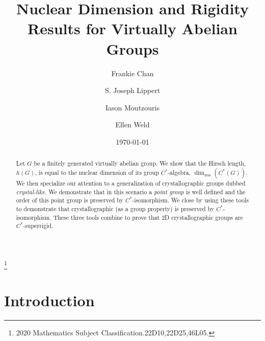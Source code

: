 \documentclass[11pt, twoside]{amsart}
\newcommand{\dimnuc }{\dim_{\operatorname{nuc}}}
\theoremstyle{definition}
\newcommand\nnfootnote[1]{%
  \begin{NoHyper}
  \renewcommand\thefootnote{}\footnote{#1}%
  \addtocounter{footnote}{-1}%
  \end{NoHyper}
}
\begin{document}
\title{Nuclear Dimension and Rigidity Results for Virtually Abelian Groups}


\author{Frankie Chan}
\address{FC: Department of Mathematics, University of Chicago, Chicago IL 60637, USA}

\author{S. Joseph Lippert}
\address{JL: Department of Mathematics and Statistics, Sam Houston State University, Huntsville TX 77341, USA}

\author{Iason Moutzouris}
\address{IM: Department of Mathematics and Statistics, Sam Houston State University, Huntsville TX 77341, USA}



\author{Ellen Weld}
\address{EW: Department of Mathematics and Statistics, Sam Houston State University, Huntsville TX 77341, USA}
\date{\today}
\nnfootnote{2020 Mathematics Subject Classification.22D10,22D25,46L05.}



\begin{abstract}
Let $G$ be a finitely generated virtually abelian group. We show that the Hirsch length, $h(G)$, is equal to the nuclear dimension of its group $C^*$-algebra, $\dimnuc (C^*(G))$. We then specialize our attention to a generalization of crystallographic groups dubbed \textit{crystal-like}. We demonstrate that in this scenario a \textit{point group} is well defined and the order of this point group is preserved by $C^*$-isomorphism. We close by using these tools to demonstrate that crystallographic (as a group property) is preserved by $C^*$-isomorphism. These three tools combine to prove that 2D crystallographic groups are $C^*$-superrigid.
\end{abstract}

\maketitle


\section{Introduction}
\end{document}
